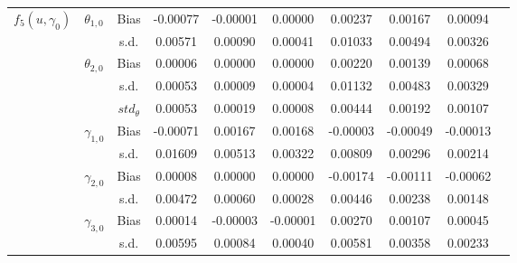 \documentclass[a4paper,12pt,times,numbered,print,index]{report}
\numberwithin{equation}{section}
\begin{document}
\begin{table}[htbp]
\begin{adjustbox}{max width=0.95\textwidth}
\begin{tabular}{clcccccccc}
				\multirow{10}[0]{*}{$f_5(u,\gamma_{0})$} & \multirow{2}[0]{*}{$\theta_{1,0}$} & Bias & -0.00077 & -0.00001 & 0.00000 & 0.00237 & 0.00167 & 0.00094 \\
				&   & s.d. & 0.00571 & 0.00090 & 0.00041 & 0.01033 & 0.00494 & 0.00326 \\
				& \multirow{2}[0]{*}{$\theta_{2,0}$} & Bias & 0.00006 & 0.00000 & 0.00000 & 0.00220 & 0.00139 & 0.00068 \\
				&   & s.d. & 0.00053 & 0.00009 & 0.00004 & 0.01132 & 0.00483 & 0.00329\\			
				&	& $std_{\theta}$  & 0.00053 & 0.00019 & 0.00008 & 0.00444 & 0.00192 & 0.00107 \\
				& \multirow{2}[0]{*}{$\gamma_{1,0}$} & Bias & -0.00071 & 0.00167 & 0.00168 & -0.00003 & -0.00049 & -0.00013 \\
				&   & s.d. & 0.01609 & 0.00513 & 0.00322 & 0.00809 & 0.00296 & 0.00214 \\
				& \multirow{2}[0]{*}{$\gamma_{2,0}$} & Bias & 0.00008 & 0.00000 & 0.00000 & -0.00174 & -0.00111 & -0.00062 \\
				&   & s.d. & 0.00472 & 0.00060 & 0.00028 & 0.00446 & 0.00238 & 0.00148 \\
				& \multirow{2}[0]{*}{$\gamma_{3,0}$} & Bias & 0.00014 & -0.00003 & -0.00001 & 0.00270 & 0.00107 & 0.00045 \\
				&   & s.d. & 0.00595 & 0.00084 & 0.00040 & 0.00581 & 0.00358 & 0.00233 \\
				
				\hline \hline
			\end{tabular}%
		\end{adjustbox}
	\end{table}%
	
	
	
\end{document}
